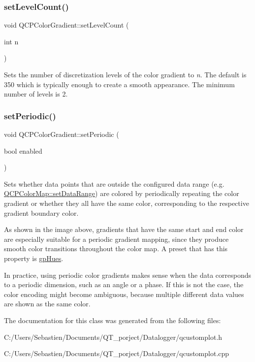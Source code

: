 \subsubsection{\texorpdfstring{set\+Level\+Count()}{setLevelCount()}}
{\footnotesize\ttfamily void Q\+C\+P\+Color\+Gradient\+::set\+Level\+Count (\begin{DoxyParamCaption}\item[{int}]{n }\end{DoxyParamCaption})}

Sets the number of discretization levels of the color gradient to {\itshape n}. The default is 350 which is typically enough to create a smooth appearance. The minimum number of levels is 2.

 \mbox{\label{class_q_c_p_color_gradient_a39d6448155fc00a219f239220d14bb39}} 
\subsubsection{\texorpdfstring{set\+Periodic()}{setPeriodic()}}
{\footnotesize\ttfamily void Q\+C\+P\+Color\+Gradient\+::set\+Periodic (\begin{DoxyParamCaption}\item[{bool}]{enabled }\end{DoxyParamCaption})}

Sets whether data points that are outside the configured data range (e.\+g. \hyperlink{class_q_c_p_color_map_a980b42837821159786a85b4b7dcb8774}{Q\+C\+P\+Color\+Map\+::set\+Data\+Range}) are colored by periodically repeating the color gradient or whether they all have the same color, corresponding to the respective gradient boundary color.



As shown in the image above, gradients that have the same start and end color are especially suitable for a periodic gradient mapping, since they produce smooth color transitions throughout the color map. A preset that has this property is \hyperlink{class_q_c_p_color_gradient_aed6569828fee337023670272910c9072a30efe58407acfb67939032f70213a130}{gp\+Hues}.

In practice, using periodic color gradients makes sense when the data corresponds to a periodic dimension, such as an angle or a phase. If this is not the case, the color encoding might become ambiguous, because multiple different data values are shown as the same color. 

The documentation for this class was generated from the following files\+:\begin{DoxyCompactItemize}
\item 
C\+:/\+Users/\+Sebastien/\+Documents/\+Q\+T\+\_\+porject/\+Datalogger/qcustomplot.\+h\item 
C\+:/\+Users/\+Sebastien/\+Documents/\+Q\+T\+\_\+porject/\+Datalogger/qcustomplot.\+cpp\end{DoxyCompactItemize}
